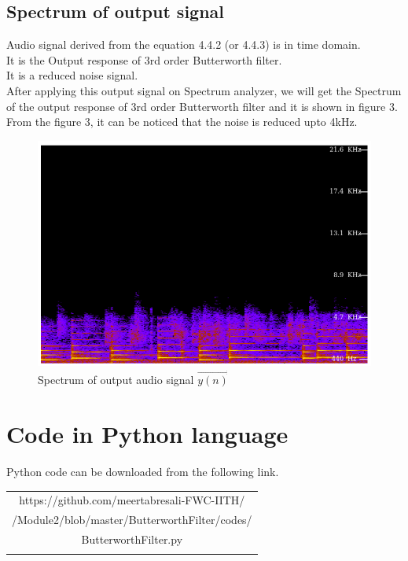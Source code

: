 \documentclass[journal,10pt,twocolumn]{article}
\begin{document}
\begin{flushleft}
\section{Spectrum of output signal}
\vspace{0.5cm}
Audio signal derived from the equation 4.4.2 (or 4.4.3) is in time domain.\\
It is the Output response of 3rd order Butterworth filter.\\
It is a reduced noise signal.\\
\vspace{0.2cm}
After applying this output signal on Spectrum analyzer, we will get the Spectrum of the output response of 3rd order Butterworth filter and it is shown in figure 3.\\
\vspace{0.2cm}
From the figure 3, it can be noticed that the noise is reduced upto 4kHz.\\
\end{flushleft}

\begin{figure}[h]

\includegraphics[width=1\columnwidth]{filtered.png}
\caption{Spectrum of output audio signal $\vec{y(n)}$}
\label{fig:Spectrum of output audio signal}
\end{figure}

\section{Code in Python language}
\centering
Python code can be downloaded from the following link.
\begin{table}[h]
\centering
\begin{tabular}{|c|} \hline
\rule{0pt}{10pt} 
https://github.com/meertabresali-FWC-IITH/\\
/Module2/blob/master/ButterworthFilter/codes/\\
ButterworthFilter.py\\
\\\hline
 \end{tabular}
\end{table}
\end{document}
